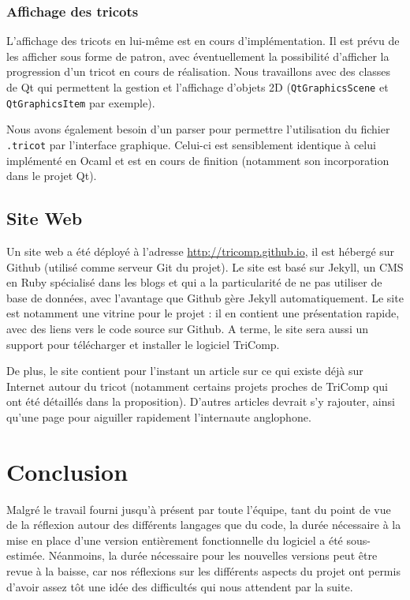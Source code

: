 \documentclass{article}
\begin{document}
\subsubsection{Affichage des tricots}

L'affichage des tricots en lui-même est en cours d'implémentation. Il est prévu de les afficher sous forme de patron, avec éventuellement
la possibilité d'afficher la progression d'un tricot en cours de réalisation.
Nous travaillons avec des classes de Qt qui permettent la gestion et l'affichage d'objets 2D (\texttt{QtGraphicsScene} et \texttt
{QtGraphicsItem} par exemple).

Nous avons également besoin d'un parser pour permettre l'utilisation du fichier \texttt{.tricot} par l'interface graphique. Celui-ci est 
sensiblement identique à celui implémenté en Ocaml et est en cours de finition (notamment son incorporation dans le projet Qt).

\subsection{Site Web}

Un site web a été déployé à l'adresse \url{http://tricomp.github.io}, il est hébergé sur Github (utilisé comme serveur Git du projet). Le
site est basé sur Jekyll, un CMS en Ruby spécialisé dans les blogs et qui a la particularité de ne pas utiliser de base de données, avec
l'avantage que Github gère Jekyll automatiquement. Le site est notamment une vitrine pour le projet : il en contient une présentation
rapide, avec des liens vers le code source sur Github. A terme, le site sera aussi un support pour télécharger et installer le logiciel
TriComp.

De plus, le site contient pour l'instant un article sur ce qui existe déjà sur Internet autour du tricot (notamment certains projets
proches de TriComp qui ont été détaillés dans la proposition). D'autres articles devrait s'y rajouter, ainsi qu'une page pour aiguiller
rapidement l'internaute anglophone.

\section{Conclusion}

Malgré le travail fourni jusqu'à présent par toute l'équipe, tant du point de vue de la réflexion autour des différents langages que du code, la durée nécessaire à la mise en place d'une version entièrement fonctionnelle du logiciel a été sous-estimée. Néanmoins, la durée nécessaire pour les nouvelles versions peut être revue à la baisse, car nos réflexions sur les différents aspects du projet ont permis d'avoir assez tôt une idée des difficultés qui nous attendent par la suite.
\end{document}
